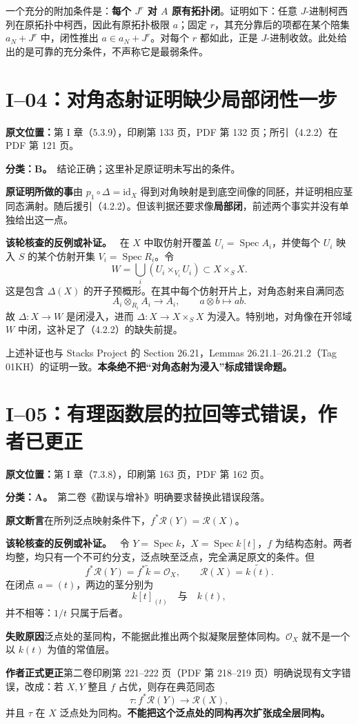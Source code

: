 \documentclass[UTF8,a4paper]{ctexbook}
\newcommand{\OO}{\mathscr O}
\DeclareMathOperator{\Spec}{Spec}
\newcommand{\RR}{\mathcal R}
\newcommand{\oldauditsrc}[1]{\par\noindent\textbf{原文位置：}#1。\par}
\newcommand{\kind}[2]{\noindent\textbf{分类：#1。}\ #2\par}
\newcommand{\lead}[1]{\par\noindent\textbf{#1}\quad}
\newenvironment{analysisproof}{\par\noindent\textbf{该轮核查的反例或补证。}\ }{\par}
\begin{document}
一个充分的附加条件是：\textbf{每个 $J^r$ 对 $A$ 原有拓扑闭}。证明如下：任意 $J$-进制柯西列在原拓扑中柯西，因此有原拓扑极限 $a$；固定 $r$，其充分靠后的项都在某个陪集 $a_N+J^r$ 中，闭性推出 $a\in a_N+J^r$。对每个 $r$ 都如此，正是 $J$-进制收敛。此处给出的是可靠的充分条件，不声称它是最弱条件。

\section{I--04：对角态射证明缺少局部闭性一步}
\oldauditsrc{第 I 章（5.3.9），印刷第 133 页，PDF 第 132 页；所引（4.2.2）在 PDF 第 121 页}
\kind{B}{结论正确；这里补足原证明未写出的条件。}
\lead{原证明所做的事}由 $p_1\circ\Delta=\mathrm{id}_X$ 得到对角映射是到底空间像的同胚，并证明相应茎同态满射。随后援引（4.2.2）。但该判据还要求像\textbf{局部闭}，前述两个事实并没有单独给出这一点。
\begin{analysisproof}
在 $X$ 中取仿射开覆盖 $U_i=\Spec A_i$，并使每个 $U_i$ 映入 $S$ 的某个仿射开集 $V_i=\Spec R_i$。令
\[
W=\bigcup_i(U_i\times_{V_i}U_i)\subset X\times_S X.
\]
这是包含 $\Delta(X)$ 的开子预概形。在其中每个仿射开片上，对角态射来自满同态
\[
A_i\otimes_{R_i}A_i\longrightarrow A_i,
\qquad a\otimes b\longmapsto ab.
\]
故 $\Delta:X\to W$ 是闭浸入，进而 $\Delta:X\to X\times_SX$ 为浸入。特别地，对角像在开邻域 $W$ 中闭，这补足了（4.2.2）的缺失前提。
\end{analysisproof}
上述补证也与 Stacks Project 的 Section 26.21，Lemmas 26.21.1--26.21.2（Tag 01KH）的证明一致。\textbf{本条绝不把“对角态射为浸入”标成错误命题。}

\section{I--05：有理函数层的拉回等式错误，作者已更正}
\oldauditsrc{第 I 章（7.3.8），印刷第 163 页，PDF 第 162 页}
\kind{A}{第二卷《勘误与增补》明确要求替换此错误段落。}
\lead{原文断言}在所列泛点映射条件下，$f^*\RR(Y)=\RR(X)$。
\begin{analysisproof}
令 $Y=\Spec k$，$X=\Spec k[t]$，$f$ 为结构态射。两者均整，均只有一个不可约分支，泛点映至泛点，完全满足原文的条件。但
\[
f^*\RR(Y)=f^*\widetilde{k}=\OO_X,
\qquad \RR(X)=\widetilde{k(t)}.
\]
在闭点 $a=(t)$，两边的茎分别为
\[
k[t]_{(t)}\quad\text{与}\quad k(t),
\]
并不相等：$1/t$ 只属于后者。
\end{analysisproof}
\lead{失败原因}泛点处的茎同构，不能据此推出两个拟凝聚层整体同构。$\OO_X$ 就不是一个以 $k(t)$ 为值的常值层。
\lead{作者正式更正}第二卷印刷第 221--222 页（PDF 第 218--219 页）明确说现有文字错误，改成：若 $X,Y$ 整且 $f$ 占优，则存在典范同态
\[
\tau:f^*\RR(Y)\longrightarrow\RR(X),
\]
并且 $\tau$ 在 $X$ 泛点处为同构。\textbf{不能把这个泛点处的同构再次扩张成全层同构。}
\end{document}
